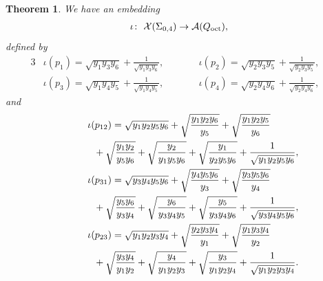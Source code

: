 \documentclass[10pt,a4paper]{amsart}
\numberwithin{equation}{section}
\newtheorem{Theorem}{Theorem}[section]
\begin{document}
\begin{Theorem} \label{thm:map_sphere} We have an embedding
 \begin{gather*}
 \iota\colon \ \mathcal{X}(\Sigma_{0,4}) \to \mathcal{A}(Q_{\text{\rm oct}}) ,
 \end{gather*}
 defined by
 \begin{alignat}{3}
& \iota({p}_{1})= \sqrt{y_1 y_3 y_6} + \frac{1}{\sqrt{y_1 y_3 y_6}} , \qquad && \iota({p}_2)= \sqrt{y_2 y_3 y_5} + \frac{1}{\sqrt{y_2 y_3 y_5}} ,&\nonumber \\
& \iota({p}_3)= \sqrt{y_1 y_4 y_5} + \frac{1}{\sqrt{y_1 y_4 y_5}} ,\qquad && \iota( {p}_4 )= \sqrt{y_2 y_4 y_6} + \frac{1}{\sqrt{y_2 y_4 y_6}} ,& \label{b_from_y}
 \end{alignat}
 and
 \begin{gather}
 \iota(p_{12})= \sqrt{y_1 y_2 y_5 y_6} + \sqrt{\frac{y_1 y_2 y_6}{y_5}} + \sqrt{\frac{y_1 y_2 y_5}{y_6}}\nonumber \\
 \hphantom{\iota(p_{12})=}{} + \sqrt{\frac{y_1 y_2}{y_5 y_6}} + \sqrt{\frac{y_2}{y_1 y_5 y_6}} + \sqrt{\frac{y_1}{y_2 y_5 y_6}} + \frac{1}{ \sqrt{y_1 y_2 y_5 y_6} },\nonumber\\
\iota(p_{31})= \sqrt{y_3 y_4 y_5 y_6} + \sqrt{\frac{y_4 y_5 y_6}{y_3}} + \sqrt{\frac{y_3 y_5 y_6}{y_4}}\nonumber \\
 \hphantom{\iota(p_{31})=}{} + \sqrt{\frac{y_5 y_6}{y_3 y_4}} + \sqrt{\frac{y_6}{y_3 y_4 y_5}} + \sqrt{\frac{y_5}{y_3 y_4 y_6}} + \frac{1}{ \sqrt{y_3 y_4 y_5 y_6} },\nonumber\\
\iota(p_{23})= \sqrt{y_1 y_2 y_3 y_4} + \sqrt{\frac{y_2 y_3 y_4}{y_1}} + \sqrt{\frac{y_1 y_3 y_4}{y_2}}\nonumber \\
\hphantom{\iota(p_{23})=}{} + \sqrt{\frac{y_3 y_4}{y_1 y_2}} + \sqrt{\frac{y_4}{y_1 y_2 y_3}} + \sqrt{\frac{y_3}{y_1 y_2 y_4}} + \frac{1}{ \sqrt{y_1 y_2 y_3 y_4} }. \label{x_from_y}
 \end{gather}
\end{Theorem}
\end{document}
